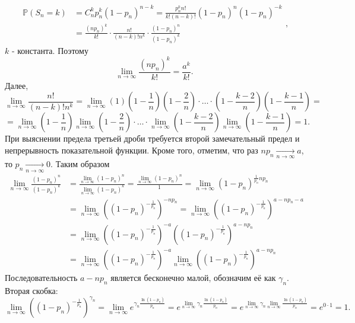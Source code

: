 \documentclass[oneside,final,14pt]{extreport}
\theoremstyle{definition}
\begin{document}
$$\begin{aligned}
\mathbb{P}\left(S_{n}=k\right) &=C_{n}^{k} p_{n}^{k}\left(1-p_{n}\right)^{n-k}=\frac{p_{n}^{k} n !}{k !(n-k) !}\left(1-p_{n}\right)^{n}\left(1-p_{n}\right)^{-k} \\
&=\frac{\left(n p_{n}\right)^{k}}{k !} \cdot \frac{n !}{(n-k) ! n^{k}} \cdot \frac{\left(1-p_{n}\right)^{n}}{\left(1-p_{n}\right)^{k}}
\end{aligned},$$
$k$ - константа. Поэтому
$$\lim\limits_{n \to \infty} \frac{\left(n p_{n}\right)^{k}}{k !}=\frac{a^{k}}{k !}.$$
Далее,
$$\lim _{n \to \infty} \frac{n !}{(n-k) ! n^{k}}=\lim _{n \to \infty}(1)\left(1-\frac{1}{n}\right)\left(1-\frac{2}{n}\right) \cdot \ldots \cdot\left(1-\frac{k-2}{n}\right)\left(1-\frac{k-1}{n}\right) =$$
$$=\lim _{n \to \infty}\left(1-\frac{1}{n}\right) \lim _{n \to \infty}\left(1-\frac{2}{n}\right) \cdot \ldots \cdot \lim _{n \to \infty}\left(1-\frac{k-2}{n}\right) \lim _{n \to \infty}\left(1-\frac{k-1}{n}\right)=1.$$
При выяснении предела третьей дроби требуется второй замечательный предел и
непрерывность показательной функции. Кроме того, отметим, что раз $n p_{n} \underset{n \to \infty}{\longrightarrow} a$, то $p_{n} \underset{n \to \infty}{\longrightarrow} 0$. Таким образом
$$\begin{aligned}
\lim _{n \to \infty} \frac{\left(1-p_{n}\right)^{n}}{\left(1-p_{n}\right)^{k}} &=\frac{\lim _{n \to \infty}\left(1-p_{n}\right)^{n}}{\lim _{n \to \infty}\left(1-p_{n}\right)^{k}}=\frac{\lim _{n \to \infty}\left(1-p_{n}\right)^{n}}{1}=\lim _{n \to \infty}\left(1-p_{n}\right)^{\frac{1}{p_{n}} n p_{n}} \\
&=\lim _{n \to \infty}\left(\left(1-p_{n}\right)^{-\frac{1}{p_{n}}}\right)^{-n p_{n}}=\lim _{n \to \infty}\left(\left(1-p_{n}\right)^{-\frac{1}{p_{n}}}\right)^{a-n p_{n}-a} \\
&=\lim _{n \to \infty}\left(\left(1-p_{n}\right)^{-\frac{1}{p_{n}}}\right)^{-a}\left(\left(1-p_{n}\right)^{-\frac{1}{p_{n}}}\right)^{a-n p_{n}} \\
&=\lim _{n \to \infty}\left(\left(1-p_{n}\right)^{-\frac{1}{p_{n}}}\right)^{-a} \lim _{n \to \infty}\left(\left(1-p_{n}\right)^{-\frac{1}{p_{n}}}\right)^{a-n p_{n}}
\end{aligned}$$
Последовательность $a - np_n$ является бесконечно малой, обозначим её как $\gamma_n.$ Вторая скобка:
$$\lim _{n \to \infty}\left(\left(1-p_{n}\right)^{-\frac{1}{p_{n}}}\right)^{\gamma_{n}}=\lim _{n \to \infty} e^{\gamma_{n} \frac{\ln \left(1-p_{n}\right)}{p_{n}}}=e^{\lim\limits _{n \to \infty} \gamma_{n} \frac{\ln \left(1-p_{n}\right)}{p_{n}}}=e^{\lim\limits _{n \to \infty} \gamma_{n} \lim\limits_{n \to \infty} \frac{\ln \left(1-p_{n}\right)}{p_{n}}}=e^{0 \cdot 1}=1.$$
\end{document}
